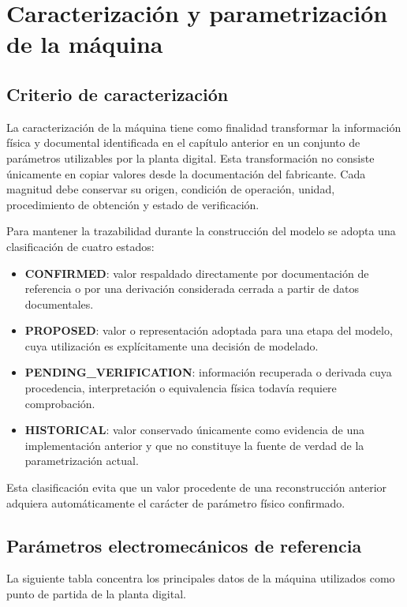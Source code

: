 \section{Caracterización y parametrización de la máquina}

\subsection{Criterio de caracterización}

La caracterización de la máquina tiene como finalidad transformar la información física y documental identificada en el capítulo anterior en un conjunto de parámetros utilizables por la planta digital. Esta transformación no consiste únicamente en copiar valores desde la documentación del fabricante. Cada magnitud debe conservar su origen, condición de operación, unidad, procedimiento de obtención y estado de verificación.

Para mantener la trazabilidad durante la construcción del modelo se adopta una clasificación de cuatro estados:

\begin{itemize}
    \item \textbf{CONFIRMED}: valor respaldado directamente por documentación de referencia o por una derivación considerada cerrada a partir de datos documentales.
    \item \textbf{PROPOSED}: valor o representación adoptada para una etapa del modelo, cuya utilización es explícitamente una decisión de modelado.
    \item \textbf{PENDING\_VERIFICATION}: información recuperada o derivada cuya procedencia, interpretación o equivalencia física todavía requiere comprobación.
    \item \textbf{HISTORICAL}: valor conservado únicamente como evidencia de una implementación anterior y que no constituye la fuente de verdad de la parametrización actual.
\end{itemize}

Esta clasificación evita que un valor procedente de una reconstrucción anterior adquiera automáticamente el carácter de parámetro físico confirmado.

\subsection{Parámetros electromecánicos de referencia}

La siguiente tabla concentra los principales datos de la máquina utilizados como punto de partida de la planta digital.

